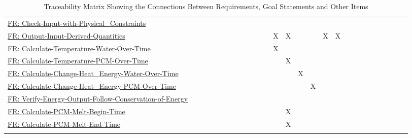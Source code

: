 \documentclass[12pt]{article}
\begin{document}
\begin{longtable}{l l l l l l l l l l l l l l l l l l l l l l l l l l l}
\\
\hyperref[checkWithPhysConsts]{FR: Check-Input-with-Physical\_Constraints} &  &  &  &  &  &  &  &  &  &  &  &  &  &  &  &  &  &  &  &  &  &  &  &  &  & 
\\
\hyperref[outputInputDerivQuants]{FR: Output-Input-Derived-Quantities} &  &  &  &  &  &  &  &  &  &  &  & X & X &  &  & X & X &  &  &  &  &  &  &  &  & 
\\
\hyperref[calcTempWtrOverTime]{FR: Calculate-Temperature-Water-Over-Time} &  &  &  &  &  &  &  &  &  &  &  & X &  &  &  &  &  &  &  &  &  &  &  &  &  & 
\\
\hyperref[calcTempPCMOverTime]{FR: Calculate-Temperature-PCM-Over-Time} &  &  &  &  &  &  &  &  &  &  &  &  & X &  &  &  &  &  &  &  &  &  &  &  &  & 
\\
\hyperref[calcChgHeatEnergyWtrOverTime]{FR: Calculate-Change-Heat\_Energy-Water-Over-Time} &  &  &  &  &  &  &  &  &  &  &  &  &  & X &  &  &  &  &  &  &  &  &  &  &  & 
\\
\hyperref[calcChgHeatEnergyPCMOverTime]{FR: Calculate-Change-Heat\_Energy-PCM-Over-Time} &  &  &  &  &  &  &  &  &  &  &  &  &  &  & X &  &  &  &  &  &  &  &  &  &  & 
\\
\hyperref[verifyEnergyOutput]{FR: Verify-Energy-Output-Follow-Conservation-of-Energy} &  &  &  &  &  &  &  &  &  &  &  &  &  &  &  &  &  &  &  &  &  &  &  &  &  & 
\\
\hyperref[calcPCMMeltBegin]{FR: Calculate-PCM-Melt-Begin-Time} &  &  &  &  &  &  &  &  &  &  &  &  & X &  &  &  &  &  &  &  &  &  &  &  &  & 
\\
\hyperref[calcPCMMeltEnd]{FR: Calculate-PCM-Melt-End-Time} &  &  &  &  &  &  &  &  &  &  &  &  & X &  &  &  &  &  &  &  &  &  &  &  &  & 
\\
\bottomrule
\caption{Traceability Matrix Showing the Connections Between Requirements, Goal Statements and Other Items}
\label{Table:TraceMatAllvsR}
\end{longtable}
\end{document}
